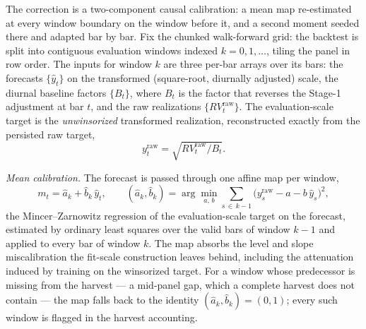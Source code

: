 The correction is a two-component causal calibration: a mean map
re-estimated at every window boundary on the window before it, and a
second moment seeded there and adapted bar by bar. Fix the chunked
walk-forward grid: the backtest is split into contiguous evaluation
windows indexed $k = 0, 1, \dots$, tiling the panel in row order. The
inputs for window $k$ are three per-bar arrays over its bars: the
forecasts $\{\hat{y}_t\}$ on the transformed (square-root, diurnally
adjusted) scale, the diurnal baseline factors $\{B_t\}$, where $B_t$ is
the factor that reverses the Stage-1 adjustment at bar $t$, and the raw
realizations $\{RV^{\mathrm{raw}}_t\}$. The evaluation-scale target is the
\emph{unwinsorized} transformed realization, reconstructed exactly from
the persisted raw target,
\begin{equation}
    y^{\mathrm{raw}}_t = \sqrt{RV^{\mathrm{raw}}_t / B_t}.
    \label{eq:yraw}
\end{equation}

\emph{Mean calibration.} The forecast is passed through one affine map per
window,
\begin{equation}
    m_t = \hat{a}_k + \hat{b}_k\, \hat{y}_t,
    \qquad
    (\hat{a}_k, \hat{b}_k)
    = \arg\min_{a,\, b} \sum_{s \,\in\, k-1}
      \bigl(y^{\mathrm{raw}}_s - a - b\,\hat{y}_s\bigr)^2,
    \label{eq:mean_calib}
\end{equation}
the Mincer--Zarnowitz regression of the evaluation-scale target on the
forecast, estimated by ordinary least squares over the valid bars of
window $k-1$ and applied to every bar of window $k$. The map absorbs the
level and slope miscalibration the fit-scale construction leaves behind,
including the attenuation induced by training on the winsorized target.
For a window whose predecessor is missing from the harvest --- a
mid-panel gap, which a complete harvest does not contain --- the map
falls back to the identity $(\hat{a}_k, \hat{b}_k) = (0, 1)$; every such
window is flagged in the harvest accounting.

